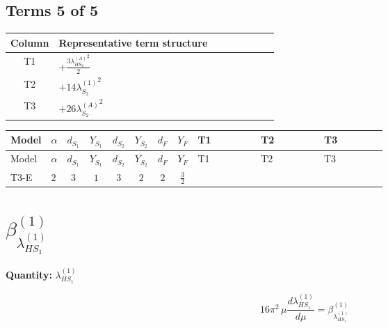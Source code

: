 \documentclass[8pt]{article}
\begin{document}
\begin{landscape}
\subsection*{Terms 5 of 5}
\begin{center}
\begin{tabular}{@{}c >{\raggedright\arraybackslash}p{0.82\linewidth}@{}}
\toprule
Column & Representative term structure \\
\midrule
T1 & \(\displaystyle +\frac{3 {\lambda_{HS_2}^{(A)}}^2}{2}\) \\
\midrule
T2 & \(\displaystyle +14 {\lambda_{S_2}^{(1)}}^2\) \\
\midrule
T3 & \(\displaystyle +26 {\lambda_{S_2}^{(A)}}^2\) \\
\midrule
\bottomrule
\end{tabular}
\end{center}
\smallskip
\tiny
\begin{longtable}{@{}llcccccc >{\raggedright\arraybackslash}p{0.21\linewidth} >{\raggedright\arraybackslash}p{0.21\linewidth} >{\raggedright\arraybackslash}p{0.21\linewidth}@{}}
\toprule
Model & $\alpha$ & $d_{S_1}$ & $Y_{S_1}$ & $d_{S_2}$ & $Y_{S_2}$ & $d_F$ & $Y_F$ & T1 & T2 & T3 \\
\midrule
\endfirsthead
\toprule
Model & $\alpha$ & $d_{S_1}$ & $Y_{S_1}$ & $d_{S_2}$ & $Y_{S_2}$ & $d_F$ & $Y_F$ & T1 & T2 & T3 \\
\midrule
\endhead
T3-E & $2$ & $3$ & $1$ & $3$ & $2$ & $2$ & $\frac{3}{2}$ & \scriptsize\adjustbox{max width=\linewidth}{$\begin{gathered} +\frac{3 {\lambda_{HS_2}^{(A)}}^2}{2}\end{gathered}$} & \scriptsize\adjustbox{max width=\linewidth}{$\begin{gathered} +14 {\lambda_{S_2}^{(1)}}^2\end{gathered}$} & \scriptsize\adjustbox{max width=\linewidth}{$\begin{gathered} +26 {\lambda_{S_2}^{(A)}}^2\end{gathered}$} \\
\midrule
\bottomrule
\end{longtable}
\clearpage
\section*{$\beta_{\lambda_{HS_1}^{(1)}}^{(1)}$}
\noindent\textbf{Quantity: }$\lambda_{HS_1}^{(1)}$\par\smallskip
\[16\pi^2\,\mu\frac{d \lambda_{HS_1}^{(1)}}{d\mu}=\beta_{\lambda_{HS_1}^{(1)}}^{(1)}\]

\end{landscape}
\end{document}
